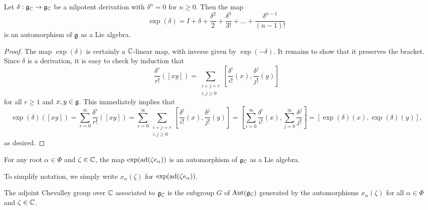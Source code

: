 \begin{proposition}
    Let $\delta:\mathfrak{g}_{\mathbb{C}}\to\mathfrak{g}_{\mathbb{C}}$ be a nilpotent derivation with $\delta^n=0$ for $n\geq 0$. Then the map $$\exp(\delta)=I+\delta+\frac{\delta^2}{2}+\frac{\delta^3}{3!}+\dots+\frac{\delta^{n-1}}{(n-1)!}$$
    is an automorphism of $\mathfrak{g}$ as a Lie algebra.
\end{proposition}
\begin{proof}
    The map $\exp(\delta)$ is certainly a $\mathbb{C}$-linear map, with inverse given by $\exp(-\delta)$. It remains to show that it preserves the bracket. Since $\delta$ is a derivation, it is easy to check by induction that 
    $$\frac{\delta^r}{r!}([xy])=\sum_{\substack{i+j=r \\ i,j\geq 0}}\left[\frac{\delta^i}{i!}(x),\frac{\delta^{j}}{j!}(y)\right]$$ 
    for all $r\geq 1$ and $x,y\in\mathfrak{g}$. This immediately implies that
    $$\exp(\delta)([xy])=\sum_{r=0}^{\infty}\frac{\delta^r}{r!}([xy])=\sum_{r=0}^{\infty}\sum_{\substack{i+j=r \\ i,j\geq 0}}\left[\frac{\delta^i}{i!}(x),\frac{\delta^{j}}{j!}(y)\right]=\left[\sum_{i=0}^\infty\frac{\delta^i}{i!}(x),\sum_{j=0}^{\infty}\frac{\delta^j}{j!}\right]=[\exp(\delta)(x),\exp(\delta)(y)],$$
    as desired.
\end{proof}

\begin{cor}\label{cor:xalpha_automorphism}
    For any root $\alpha\in\Phi$ and $\zeta\in \mathbb{C}$, the map $\exp(\mathrm{ad}(\zeta e_\alpha))$ is an automorphism of $\fg_\CC$ as a Lie algebra.
\end{cor}

To simplify notation, we simply write $x_\alpha(\zeta)$ for $\exp(\mathrm{ad}(\zeta e_\alpha))$. 
\iffalse In addition, for any $\chi\in\Hom(\ZZ\Phi,\CC^*)$, we define the automorphism of $\fg_\CC$ given by
\begin{align*}
    h(\chi):\fg_\CC & \longrightarrow\fg_\CC  \\
    h_i & \longmapsto h_i\quad\quad\quad\text{ for all }1\leq i\leq n,\\
    e_\alpha &\longmapsto \chi(\alpha)e_\alpha\quad \text{ for all }\alpha\in\Phi.
\end{align*}
The fact that $\chi$ is a multiplicative character implies that $h(\chi)$ is a Lie algebra automorphism of $\fg_\CC$. \fi

\begin{definition}
    The adjoint Chevalley group over $\mathbb{C}$ associated to $\fg_\CC$ is the subgroup $G$ of $\mathrm{Aut}(\mathfrak{g}_{\mathbb{C}})$ generated by the automorphisms $x_\alpha(\zeta)$ for all $\alpha\in\Phi$ and $\zeta\in\mathbb{C}$.
    \iffalse
    $$\text{  and  }\{h(\chi):\chi\in\Hom(\ZZ\Phi,\CC^*)\}.$$
    \fi
\end{definition}

